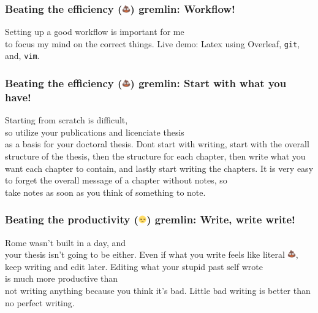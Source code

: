 \documentclass[aspectratio=1610]{beamer}
\begin{document}
	\begin{frame}[t]
		\frametitle{Beating the efficiency (\includegraphics[height=10pt]{images/poop_emoji.png}) gremlin: Workflow!}
		\vfill
		Setting up a \alert<1>{good workflow} is important for me\\ to focus my mind on the correct things.
		\vfill
		Live demo: Latex using Overleaf, \texttt{git}, and, \texttt{vim}. 
	\end{frame}
	\begin{frame}[t]
		\frametitle{Beating the efficiency (\includegraphics[height=10pt]{images/poop_emoji.png}) gremlin: Start with what you have!}
		\vfill
		Starting from scratch is difficult,\\ so \alert<1>{utilize your publications and licenciate thesis}\\ as a basis for your doctoral thesis.
		\vfill
		Dont start with writing, start with the \alert<2>{overall structure of the thesis}, then the \alert<3>{structure for each chapter}, then \alert<4>{write what you want each chapter to contain}, and \alert<5>{lastly} start writing the chapters.
		\vfill
		It is \alert<6>{very easy} to forget the overall message of a chapter \alert<6>{without notes}, so\\ \alert<7>{take notes as soon as you think of something to note}.
	\end{frame}
	\begin{frame}[t]
		\frametitle{Beating the productivity (\includegraphics[height=10pt]{images/unamused_emoji.png}) gremlin: Write, write write!}
		\vfill
		Rome wasn't built in a day, and\\ your thesis \alert<1>{isn't going to be either}.
		\vfill
		Even if what you write feels like literal \includegraphics[height=10pt]{images/poop_emoji.png},\\ keep writing and \alert<2>{edit later.}
		\vfill
		Editing what your stupid past self wrote\\ is \alert<3>{much more productive} than\\ not writing anything because you think it's bad.
		\vfill
		Little bad writing is better than no perfect writing.
	\end{frame}
\end{document}
